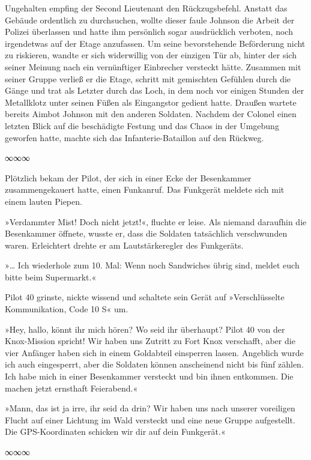 Ungehalten empfing der Second Lieutenant den Rückzugsbefehl. Anstatt das Gebäude ordentlich zu durchsuchen, wollte dieser faule Johnson die Arbeit der Polizei überlassen und hatte ihm persönlich sogar ausdrücklich verboten, noch irgendetwas auf der Etage anzufassen. Um seine bevorstehende Beförderung nicht zu riskieren, wandte er sich widerwillig von der einzigen Tür ab, hinter der sich seiner Meinung nach ein vernünftiger Einbrecher versteckt hätte. Zusammen mit seiner Gruppe verließ er die Etage, schritt mit gemischten Gefühlen durch die Gänge und trat als Letzter durch das Loch, in dem noch vor einigen Stunden der Metallklotz unter seinen Füßen als Eingangstor gedient hatte. Draußen wartete bereits Aimbot Johnson mit den anderen Soldaten. Nachdem der Colonel einen letzten Blick auf die beschädigte Festung und das Chaos in der Umgebung geworfen hatte, machte sich das Infanterie-Bataillon auf den Rückweg.

\begin{center}
    ∞∞∞
\end{center}

Plötzlich bekam der Pilot, der sich in einer Ecke der Besenkammer zusammengekauert hatte, einen Funkanruf. Das Funkgerät meldete sich mit einem lauten Piepen.

»Verdammter Mist! Doch nicht jetzt!«, fluchte er leise. Als niemand daraufhin die Besenkammer öffnete, wusste er, dass die Soldaten tatsächlich verschwunden waren. Erleichtert drehte er am Lautstärkeregler des Funkgeräts.

»… Ich wiederhole zum 10. Mal: Wenn noch Sandwiches übrig sind, meldet euch bitte beim Supermarkt.«

Pilot 40 grinste, nickte wissend und schaltete sein Gerät auf »Verschlüsselte Kommunikation, Code 10 S« um.

»Hey, hallo, könnt ihr mich hören? Wo seid ihr überhaupt? Pilot 40 von der Knox-Mission spricht! Wir haben uns Zutritt zu Fort Knox verschafft, aber die vier Anfänger haben sich in einem Goldabteil einsperren lassen. Angeblich wurde ich auch eingesperrt, aber die Soldaten können anscheinend nicht bis fünf zählen. Ich habe mich in einer Besenkammer versteckt und bin ihnen entkommen. Die machen jetzt ernsthaft Feierabend.«

»Mann, das ist ja irre, ihr seid da drin? Wir haben uns nach unserer voreiligen Flucht auf einer Lichtung im Wald versteckt und eine neue Gruppe aufgestellt. Die GPS-Koordinaten schicken wir dir auf dein Funkgerät.«

\begin{center}
    ∞∞∞
\end{center}

